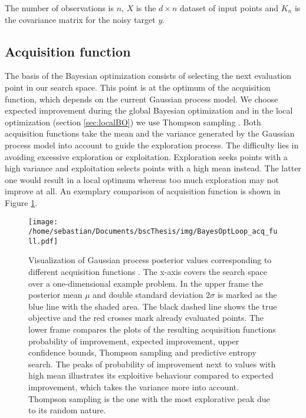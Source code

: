 The number of observations is $n$, $X$ is the $d \times n$ dataset of input points and $K_n$ is the covariance matrix for the noisy target $y$.

\subsection{Acquisition function}
The basis of the Bayesian optimization consists of selecting the next evaluation point in our search space. This point is at the optimum of the acquisition function, which depends on the current Gaussian process model. We choose expected improvement \cite{brochu2010tutorial} during the global Bayesian optimization and in the local optimization (section \ref{sec:localBO}) we use Thompson sampling \cite{akrour2017local}. Both acquisition functions take the mean and the variance generated by the Gaussian process model into account to guide the exploration process. The difficulty lies in avoiding excessive exploration or exploitation. Exploration seeks points with a high variance and exploitation selects points with a high mean instead. The latter one would result in a local optimum whereas too much exploration may not improve at all. An exemplary comparison of acquisition function is shown in Figure \ref{fig:acqFcn}.

\begin{figure}[h]
    \centering
    \texttt{[image: /home/sebastian/Documents/bscThesis/img/BayesOptLoop\_acq\_full.pdf]}
    \caption{Visualization of Gaussian process posterior values corresponding to different acquisition functions \cite{shahriari2016taking}. The x-axis covers the search space over a one-dimensional example problem. In the upper frame the posterior mean $\mu$ and double standard deviation $2\sigma$ is marked as the blue line with the shaded area. The black dashed line shows the true objective and the red crosses mark already evaluated points. The lower frame compares the plots of the resulting acquisition functions probability of improvement, expected improvement, upper confidence bounds, Thompson sampling and predictive entropy search. The peaks of probability of improvement next to values with high mean illustrates its exploitive behaviour compared to expected improvement, which takes the variance more into account. Thompson sampling is the one with the most explorative peak due to its random nature. \label{fig:acqFcn}}
\end{figure}

